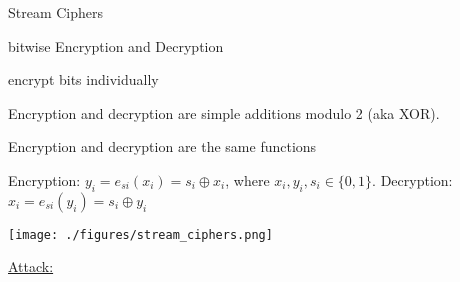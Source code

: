 \documentclass[landscape, a4paper]{article}
\begin{document}
\begin{minipage}[t]{0.198\pagewidth}
	\begin{betterlist}
		\item \alert{Stream Ciphers}
		\begin{betterlist}
			\item bitwise Encryption and Decryption
			\item encrypt bits individually
			\begin{betterlist}
				\item Encryption and decryption are simple additions modulo 2 (aka XOR).
				\item Encryption and decryption are the same functions
				\item \alert{Encryption:} $y_i = e_{si}(x_i) = s_i \oplus x_i$, where $x_i, y_i, s_i \in \{0, 1\}$. \alert{Decryption:} $x_i = e_{si}(y_i) = s_i \oplus y_i$
			\end{betterlist}
			\texttt{[image: ./figures/stream\_ciphers.png]}
			\begin{betterlist}
				\item \underline{Attack:}


\end{betterlist}
\end{betterlist}
\end{betterlist}
\end{minipage}
\end{document}
